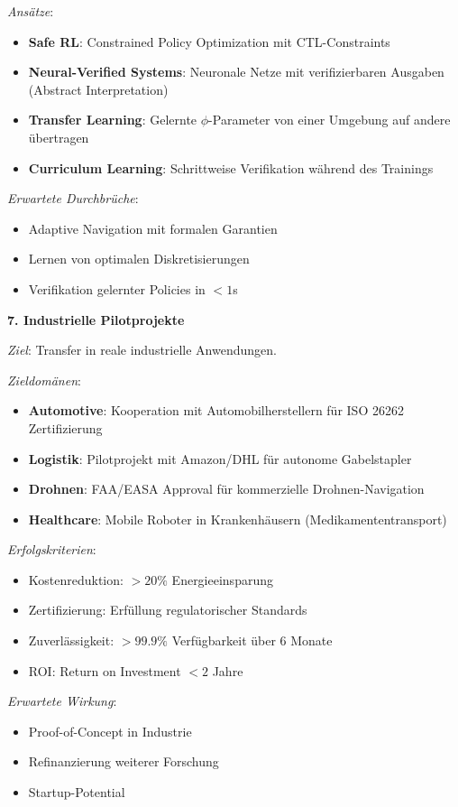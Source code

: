 ﻿\documentclass[a4paper,12pt]{article}
\theoremstyle{definition}
\begin{document}
\textit{Ansätze}:
\begin{itemize}
	\item \textbf{Safe RL}: Constrained Policy Optimization mit CTL-Constraints
	\item \textbf{Neural-Verified Systems}: Neuronale Netze mit verifizierbaren Ausgaben (Abstract Interpretation)
	\item \textbf{Transfer Learning}: Gelernte $\phi$-Parameter von einer Umgebung auf andere übertragen
	\item \textbf{Curriculum Learning}: Schrittweise Verifikation während des Trainings
\end{itemize}

\textit{Erwartete Durchbrüche}:
\begin{itemize}
	\item Adaptive Navigation mit formalen Garantien
	\item Lernen von optimalen Diskretisierungen
	\item Verifikation gelernter Policies in $< 1$s
\end{itemize}

\textbf{7. Industrielle Pilotprojekte}

\textit{Ziel}: Transfer in reale industrielle Anwendungen.

\textit{Zieldomänen}:
\begin{itemize}
	\item \textbf{Automotive}: Kooperation mit Automobilherstellern für ISO 26262 Zertifizierung
	\item \textbf{Logistik}: Pilotprojekt mit Amazon/DHL für autonome Gabelstapler
	\item \textbf{Drohnen}: FAA/EASA Approval für kommerzielle Drohnen-Navigation
	\item \textbf{Healthcare}: Mobile Roboter in Krankenhäusern (Medikamententransport)
\end{itemize}

\textit{Erfolgskriterien}:
\begin{itemize}
	\item Kostenreduktion: $> 20\%$ Energieeinsparung
	\item Zertifizierung: Erfüllung regulatorischer Standards
	\item Zuverlässigkeit: $> 99.9\%$ Verfügbarkeit über 6 Monate
	\item ROI: Return on Investment $< 2$ Jahre
\end{itemize}

\textit{Erwartete Wirkung}:
\begin{itemize}
	\item Proof-of-Concept in Industrie
	\item Refinanzierung weiterer Forschung
	\item Startup-Potential
\end{itemize}
\end{document}
